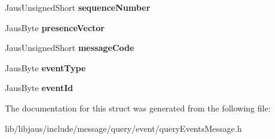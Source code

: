 \begin{DoxyCompactItemize}
\item 
\hypertarget{struct_query_events_message_struct_a5256eff953b8a447220f184d4cde5c5a}{\-Jaus\-Unsigned\-Short {\bfseries sequence\-Number}}\label{struct_query_events_message_struct_a5256eff953b8a447220f184d4cde5c5a}

\item 
\hypertarget{struct_query_events_message_struct_aaa253e6debf26362a3bb0eb5e2255490}{\-Jaus\-Byte {\bfseries presence\-Vector}}\label{struct_query_events_message_struct_aaa253e6debf26362a3bb0eb5e2255490}

\item 
\hypertarget{struct_query_events_message_struct_a15d202eb0f64e38abe2cb184bf2d50f8}{\-Jaus\-Unsigned\-Short {\bfseries message\-Code}}\label{struct_query_events_message_struct_a15d202eb0f64e38abe2cb184bf2d50f8}

\item 
\hypertarget{struct_query_events_message_struct_ae3da6b99bd960ee1b92f4b7f9b9edde9}{\-Jaus\-Byte {\bfseries event\-Type}}\label{struct_query_events_message_struct_ae3da6b99bd960ee1b92f4b7f9b9edde9}

\item 
\hypertarget{struct_query_events_message_struct_a0800db212dbd081a3cbcdceaf796269c}{\-Jaus\-Byte {\bfseries event\-Id}}\label{struct_query_events_message_struct_a0800db212dbd081a3cbcdceaf796269c}

\end{DoxyCompactItemize}


\-The documentation for this struct was generated from the following file\-:\begin{DoxyCompactItemize}
\item 
lib/libjaus/include/message/query/event/query\-Events\-Message.\-h\end{DoxyCompactItemize}
